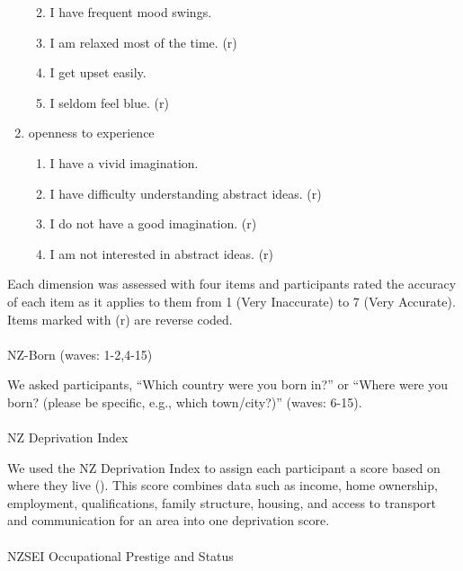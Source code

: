 \documentclass[
  single column]{article}
\makeatletter
\let\oldparagraph\paragraph
\renewcommand{\paragraph}{
    \@ifstar
      \xxxParagraphStar
      \xxxParagraphNoStar
  }
\newcommand{\xxxParagraphStar}[1]{\oldparagraph*{#1}\mbox{}}
\newcommand{\xxxParagraphNoStar}[1]{\oldparagraph{#1}\mbox{}}
\providecommand{\tightlist}{%
  \setlength{\itemsep}{0pt}\setlength{\parskip}{0pt}}\usepackage{longtable,booktabs,array}
\makeatother
\begin{document}
\begin{enumerate}
  \begin{enumerate}
  \def\labelenumii{\roman{enumii}.}
  \tightlist
  \item
    I have frequent mood swings.
  \item
    I am relaxed most of the time. (r)
  \item
    I get upset easily.
  \item
    I seldom feel blue. (r)
  \end{enumerate}
\item
  openness to experience

  \begin{enumerate}
  \def\labelenumii{\roman{enumii}.}
  \tightlist
  \item
    I have a vivid imagination.
  \item
    I have difficulty understanding abstract ideas. (r)
  \item
    I do not have a good imagination. (r)
  \item
    I am not interested in abstract ideas. (r)
  \end{enumerate}
\end{enumerate}

Each dimension was assessed with four items and participants rated the
accuracy of each item as it applies to them from 1 (Very Inaccurate) to
7 (Very Accurate). Items marked with (r) are reverse coded.

\paragraph{NZ-Born (waves: 1-2,4-15)}\label{nz-born-waves-1-24-15}

We asked participants, ``Which country were you born in?'' or ``Where
were you born? (please be specific, e.g., which town/city?)'' (waves:
6-15).

\paragraph{NZ Deprivation Index}\label{nz-deprivation-index}

We used the NZ Deprivation Index to assign each participant a score
based on where they live (). This score combines data such as income, home ownership,
employment, qualifications, family structure, housing, and access to
transport and communication for an area into one deprivation score.

\paragraph{NZSEI Occupational Prestige and
Status}\label{nzsei-occupational-prestige-and-status}
\end{document}

